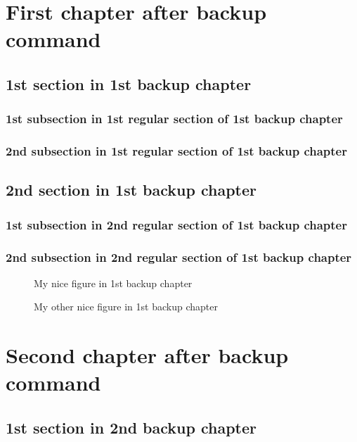 \documentclass{book}
\begin{document}
\chapter{First chapter after backup command}

\section{1st section in 1st backup chapter}

\subsection{1st subsection in 1st regular section of 1st backup chapter}
\subsection{2nd subsection in 1st regular section of 1st backup chapter}

\section{2nd section in 1st backup chapter}

\subsection{1st subsection in 2nd regular section of 1st backup chapter}
\subsection{2nd subsection in 2nd regular section of 1st backup chapter}


\begin{figure}
\caption{My nice figure in 1st backup chapter}
\end{figure}


\begin{figure}
\caption{My other nice figure in 1st backup chapter}
\end{figure}





\chapter{Second chapter after backup command}

\section{1st section in 2nd backup chapter}
\end{document}
